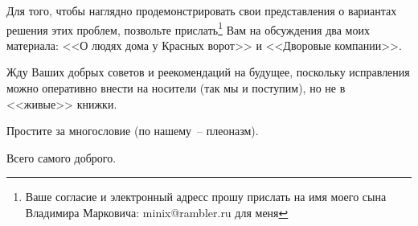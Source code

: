 \documentclass[utf8x, 12pt]{G7-32a} %
\begin{document}
Для того, чтобы наглядно продемонстрировать свои представления о вариантах решения этих проблем, позвольте прислать\footnote{Ваше согласие и электронный адресс прошу прислать на имя моего сына Владимира Марковича: minix@rambler.ru для меня} Вам на обсуждения два моих материала: <<О людях дома у Красных ворот>> и <<Дворовые компании>>.

Жду Ваших добрых советов и реекомендаций на будущее, поскольку исправления можно оперативно внести на носители (так мы и поступим), но не в <<живые>> книжки.

Простите за многословие (по нашему~-- плеоназм).

Всего самого доброго.
 
\mainmatter %



\backmatter %



\appendix   %
\end{document}
